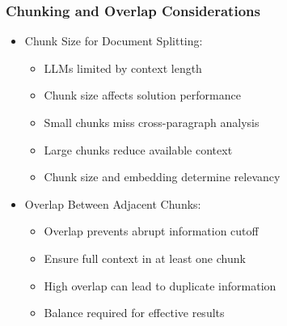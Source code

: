 \begin{frame}[fragile]
\frametitle{Chunking and Overlap Considerations}

\begin{itemize}
    \item Chunk Size for Document Splitting:
    \begin{itemize}
        \item LLMs limited by context length
        \item Chunk size affects solution performance
        \item Small chunks miss cross-paragraph analysis
        \item Large chunks reduce available context
        \item Chunk size and embedding determine relevancy
    \end{itemize}
    \item Overlap Between Adjacent Chunks:
    \begin{itemize}
        \item Overlap prevents abrupt information cutoff
        \item Ensure full context in at least one chunk
        \item High overlap can lead to duplicate information
        \item Balance required for effective results
    \end{itemize}
\end{itemize}
\end{frame}


